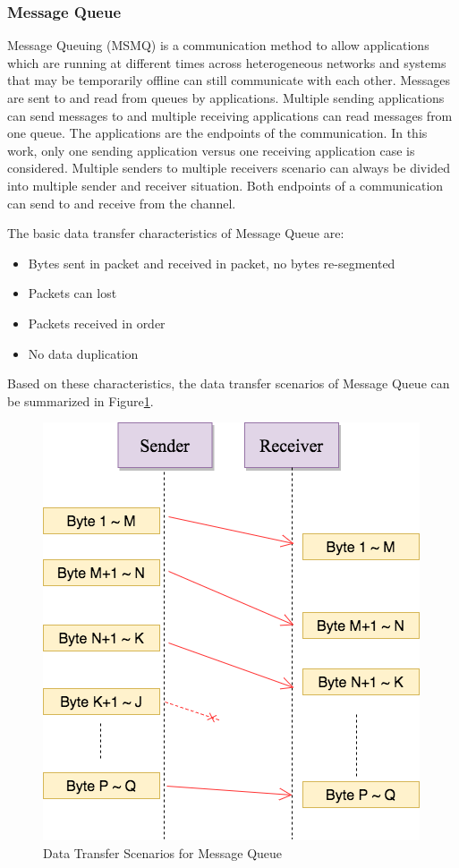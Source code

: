 \subsubsection{Message Queue}
Message Queuing (MSMQ) is a communication method to allow applications which are running at different times across heterogeneous networks and systems that may be temporarily offline can still communicate with each other. Messages are sent to and read from queues by applications. Multiple sending applications can send messages to and multiple receiving applications can read messages from one queue.\cite{redkar2004pro} The applications are the endpoints of the communication. In this work, only one sending application versus one receiving application case is considered. Multiple senders to multiple receivers scenario can always be divided into multiple sender and receiver situation. Both endpoints of a communication can send to and receive from the channel.

The basic data transfer characteristics of Message Queue are:
\begin{itemize}
  \item Bytes sent in packet and received in packet, no bytes re-segmented
  \item Packets can lost
  \item Packets received in order
  \item No data duplication
\end{itemize}
Based on these characteristics,  the data transfer scenarios of Message Queue can be summarized in Figure\ref{msmq}.
\begin{figure}[H]
\centerline{\includegraphics[scale=0.48]{Figures/msmq}}
\caption{Data Transfer Scenarios for Message Queue}
\label{msmq}
\end{figure}

